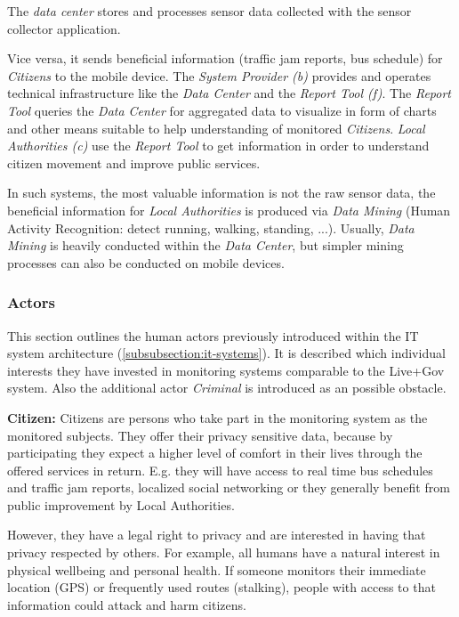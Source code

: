 The \emph{data center} stores and processes sensor data collected with the sensor collector application.

Vice versa, it sends beneficial information (traffic jam reports, bus schedule) for \textit{Citizens} to the mobile device.
The \textit{System Provider (b)} provides and operates technical infrastructure like the \textit{Data Center} and the \textit{Report Tool (f)}.
The \textit{Report Tool} queries the \textit{Data Center} for aggregated data to visualize in form of charts and other means suitable to help understanding of monitored \textit{Citizens}. 
\textit{Local Authorities (c)} use the \textit{Report Tool} to get information in order to understand citizen movement and improve public services. 

In such systems, the most valuable information is not the raw sensor data, the beneficial information for \textit{Local Authorities} is produced via \textit{Data Mining} (Human Activity Recognition: detect running, walking, standing, ...). 
Usually, \textit{Data Mining} is heavily conducted within the \textit{Data Center}, but simpler mining processes can also be conducted on mobile devices.



\subsubsection{Actors}
\label{subsubsection:humans}

This section outlines the human actors previously introduced within the IT system architecture (\ref{subsubsection:it-systems}).
It is described which individual interests they have invested in monitoring systems comparable to the Live+Gov system. 
Also the additional actor \textit{Criminal} is introduced as an possible obstacle.

\textbf{Citizen:} 
Citizens are persons who take part in the monitoring system as the monitored subjects.
They offer their privacy sensitive data, because by participating they expect a higher level of comfort in their lives through the offered services in return.
E.g. they will have access to real time bus schedules and traffic jam reports, localized social networking or they generally benefit from public improvement by Local Authorities.

However, they have a legal right to privacy and are interested in having that privacy respected by others.
For example, all humans have a natural interest in physical wellbeing and personal health. 
If someone monitors their immediate location (GPS) or frequently used routes (stalking), people with access to that information could attack and harm citizens.

